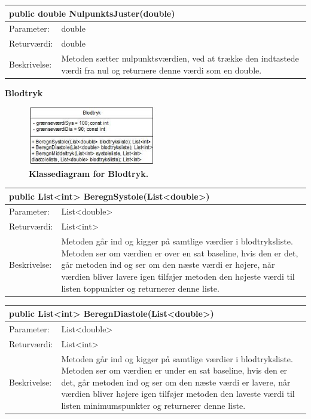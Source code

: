 \begin{table}[H]
\label{tab:tabel2}
\begin{tabular}{| l | p{13cm} |}
   \hline
   \multicolumn{2}{|l|}{public double NulpunktsJuster(double)} \\ \hline
   Parameter: & double\\ \hline
   Returværdi: & double \\ \hline
   Beskrivelse: & Metoden sætter nulpunktsværdien, ved at trække den indtastede værdi fra nul og returnere denne værdi som en double.\\ \hline
\end{tabular}
\end{table}
\textbf{Blodtryk}
\begin{figure}[H]
\includegraphics[width =0.5\textwidth , center]{billeder/klassediagramblodtryk}
\caption{\textbf{Klassediagram for Blodtryk.}}
\end{figure}
\begin{table}[H]
\label{tab:tabel2}
\begin{tabular}{| l | p{13cm} |}
   \hline
   \multicolumn{2}{|l|}{public List<int> BeregnSystole(List<double>)} \\ \hline
   Parameter: & List<double>\\ \hline
   Returværdi: & List<int> \\ \hline
   Beskrivelse: & Metoden går ind og kigger på samtlige værdier i blodtryksliste. Metoden ser om værdien er over en sat baseline, hvis den er det, går metoden ind og ser om den næste værdi er højere, når værdien bliver lavere igen tilføjer metoden den højeste værdi til listen toppunkter og returnerer denne liste. \\ \hline
\end{tabular}
\end{table}
\begin{table}[H]
\label{tab:tabel2}
\begin{tabular}{| l | p{13cm} |}
   \hline
   \multicolumn{2}{|l|}{public List<int> BeregnDiastole(List<double>)} \\ \hline
   Parameter: & List<double>\\ \hline
   Returværdi: & List<int> \\ \hline
   Beskrivelse: & Metoden går ind og kigger på samtlige værdier i blodtryksliste. Metoden ser om værdien er under en sat baseline, hvis den er det, går metoden ind og ser om den næste værdi er lavere, når værdien bliver højere igen tilføjer metoden den laveste værdi til listen minimumspunkter og returnerer denne liste. \\ \hline
\end{tabular}
\end{table}
